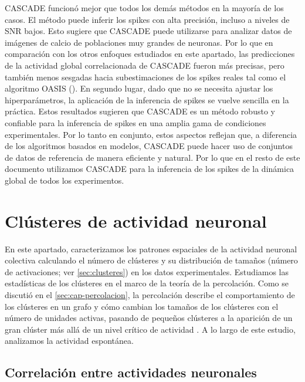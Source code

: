 CASCADE funcionó mejor que todos los demás métodos en la mayoría de los casos. El método  puede inferir  los spikes con alta precisión, incluso a niveles de SNR bajos. Esto sugiere que CASCADE puede utilizarse para analizar datos de imágenes de calcio de poblaciones muy grandes de neuronas. Por lo que  en comparación con los otros enfoques estudiados en este apartado, las predicciones de la actividad global correlacionada   de CASCADE fueron más precisas, pero también menos sesgadas hacia subestimaciones de los spikes reales tal como el algoritmo OASIS (). En segundo lugar, dado que no se  necesita ajustar los hiperparámetros, la aplicación de la inferencia de spikes se vuelve sencilla en la práctica. Estos resultados sugieren que CASCADE es un método robusto y confiable para la inferencia de spikes en una amplia gama de condiciones experimentales. Por lo tanto en conjunto, estos aspectos reflejan que, a diferencia de los algoritmos basados en modelos, CASCADE puede hacer uso de conjuntos de datos de referencia de manera eficiente y natural. Por lo que en el resto de este documento utilizamos CASCADE para  la inferencia de los spikes de la  dinámica global de todos los experimentos.

  
 
 \section{Clústeres de actividad neuronal}\label{sec:actividad_neuronal_experimento}
 
 
 
En este apartado, caracterizamos los patrones espaciales de la actividad neuronal colectiva calculando el número de clústeres y su distribución de tamaños (número de activaciones; ver \cref{sec:clusteres}) en los datos experimentales. Estudiamos las estadísticas de los clústeres en el marco de la teoría de la percolación. Como se discutió en el \cref{sec:cap-percolacion}, la percolación describe el comportamiento de los clústeres en un grafo y cómo cambian los tamaños de los clústeres con el número de unidades activas, pasando de pequeños clústeres a la aparición de un gran clúster más allá de un nivel crítico de actividad \cite{rocha_recovery_2022}. A lo largo de este estudio, analizamos la actividad espontánea.
 
 \subsection{Correlación entre actividades neuronales}\label{sec:correlacion}
 
